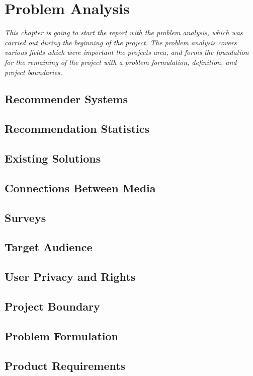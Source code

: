 \chapter{Problem Analysis}

\textit{This chapter is going to start the report with the problem analysis, which was carried out during the beginning of the project. The problem analysis covers various fields which were important the projects area, and forms the foundation for the remaining of the project with a problem formulation, definition, and project boundaries.}

\section{Recommender Systems}
\label{RecommenderSystems}

\section{Recommendation Statistics}
\label{Statistics}

\section{Existing Solutions}
\label{Existing}

\section{Connections Between Media}
\label{Connections}

\section{Surveys}
\label{Surveys}

\section{Target Audience}
\label{TargetAudience}

\section{User Privacy and Rights}
\label{User Rights}

\section{Project Boundary}
\label{Boundary}

\section{Problem Formulation}
\label{Formulation}

\section{Product Requirements}
\label{Requirements}
